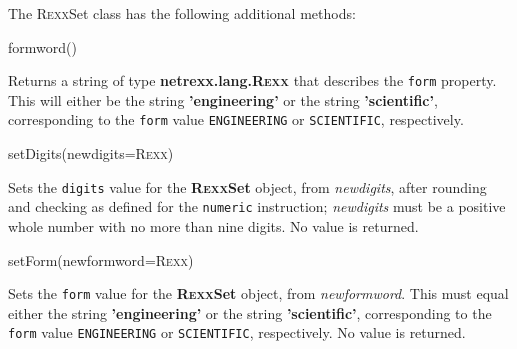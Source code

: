 The R\textsc{exx}Set class has the following additional methods:
\begin{description}
\item{formword()}

Returns a string of type \textbf{netrexx.lang.R\textsc{exx}} that describes the
\texttt{form} property.  This will either be the string \textbf{'engineering'}
or the string \textbf{'scientific'}, corresponding to the \texttt{form}
value \texttt{ENGINEERING} or \texttt{SCIENTIFIC}, respectively.
\item{setDigits(newdigits=R\textsc{exx})}

Sets the \texttt{digits} value for the \textbf{R\textsc{exx}Set} object, from
\emph{newdigits}, after rounding and checking as defined for the
\texttt{numeric} instruction; \emph{newdigits} must be a positive
whole number with no more than nine digits.
No value is returned.
\item{setForm(newformword=R\textsc{exx})}

Sets the \texttt{form} value for the \textbf{R\textsc{exx}Set} object, from
\emph{newformword}.
This must equal either the string \textbf{'engineering'} or the
string \textbf{'scientific'}, corresponding to the \texttt{form}
value \texttt{ENGINEERING} or \texttt{SCIENTIFIC}, respectively.
No value is returned.
\end{description}
